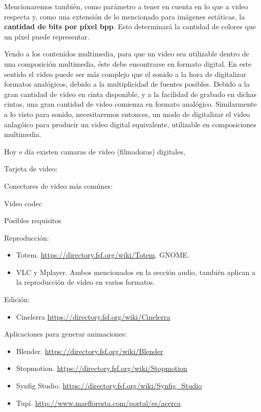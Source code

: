 \documentclass[12pt]{article}
\begin{document}
Mencionaremos también, como parámetro a tener en cuenta en lo que a video respecta
y, como una extensión de lo mencionado para imágenes estáticas, la {\bf cantidad de 
bits por píxel bpp}. Esto determinará la cantidad de colores que un píxel 
puede representar. 


Yendo a los contenidos multimedia, para que un video sea utilizable dentro de 
una composición multimedia, éste debe encontrarse en formato digital. En este 
sentido el video puede ser más complejo que el sonido a la hora de digitalizar
formatos analógicos, debido a la multiplicidad de fuentes posibles. Debido a
la gran cantidad de video en cinta disponible, y a la facilidad de grabado en 
dichas cintas, una gran cantidad de video comienza en formato analógico. 
Similarmente a lo visto para sonido, necesitaremos entonces, un modo de digitalizar 
el video anlagóico para producir un video digital equivalente, utilizable en 
composiciones multimedia. 

Hoy e día existen camaras de video (filmadoras) digitales, 


Tarjeta de video: 

Conectores de video más comúnes: 


Video codec

Posibles requisitos


Reproducción:
\begin{itemize}
\item Totem.   \url{https://directory.fsf.org/wiki/Totem}. GNOME. 
\item VLC y Mplayer.  Ambos mencionados en la sección audio, también aplican 
a la reproducción de video en varios formatos.  
\end{itemize}

Edición:
\begin{itemize}
\item Cinelerra \url{https://directory.fsf.org/wiki/Cinelerra}
\end{itemize}

Aplicaciones para generar animaciones:
\begin{itemize}
\item Blender. \url{https://directory.fsf.org/wiki/Blender}
\item Stopmotion. \url{https://directory.fsf.org/wiki/Stopmotion}
\item Synfig Studio. \url{https://directory.fsf.org/wiki/Synfig_Studio}
\item Tupí.    \url{http://www.maefloresta.com/portal/es/acerca}
\end{itemize}
\end{document}
